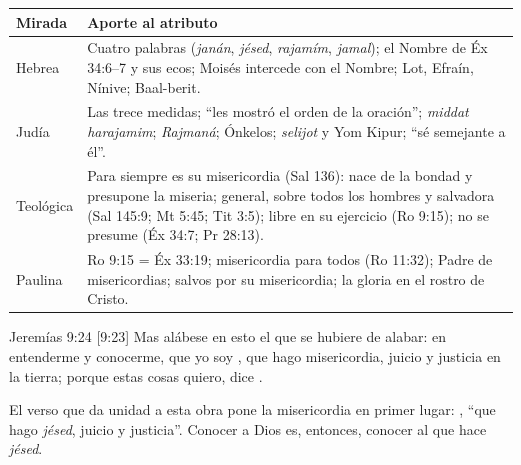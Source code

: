 \begin{center}\small\renewcommand{\arraystretch}{1.3}
\begin{tabular}{@{}L{3.0cm}L{11.4cm}@{}}
\toprule
\textbf{Mirada} & \textbf{Aporte al atributo} \\ \midrule
Hebrea & Cuatro palabras (\emph{janán}, \emph{jésed}, \emph{rajamím}, \emph{jamal}); el Nombre de Éx 34:6--7 y sus ecos; Moisés intercede con el Nombre; Lot, Efraín, Nínive; Baal-berit. \\
Judía & Las trece medidas; ``les mostró el orden de la oración''; \emph{middat harajamim}; \emph{Rajmaná}; Ónkelos; \emph{selijot} y Yom Kipur; ``sé semejante a él''. \\
Teológica & Para siempre es su misericordia (Sal 136): nace de la bondad y presupone la miseria; general, sobre todos los hombres y salvadora (Sal 145:9; Mt 5:45; Tit 3:5); libre en su ejercicio (Ro 9:15); no se presume (Éx 34:7; Pr 28:13). \\
Paulina & Ro 9:15 = Éx 33:19; misericordia para todos (Ro 11:32); Padre de misericordias; salvos por su misericordia; la gloria en el rostro de Cristo. \\
\bottomrule
\end{tabular}\end{center}

\begin{verso}{Jeremías 9:24 [9:23]}
Mas alábese en esto el que se hubiere de alabar: en entenderme y conocerme, que yo soy \SENOR, que hago misericordia, juicio y justicia en la tierra; porque estas cosas quiero, dice \SENOR.
\end{verso}

El verso que da unidad a esta obra pone la misericordia en primer lugar: , ``que hago \emph{jésed}, juicio y justicia''. Conocer a Dios es, entonces, conocer al que hace \emph{jésed}.

